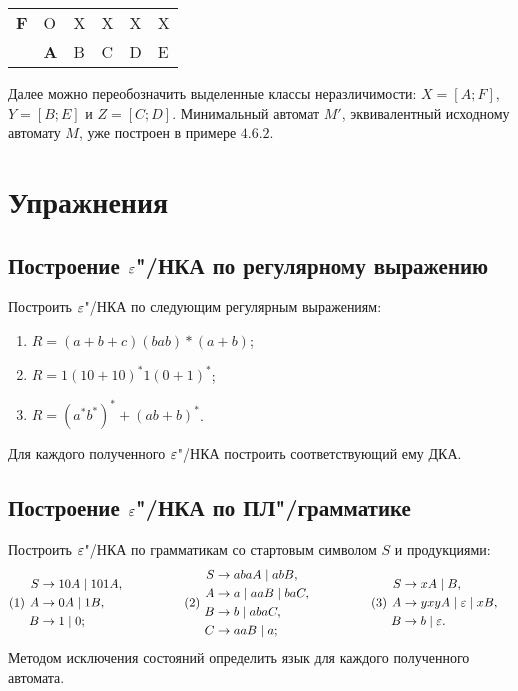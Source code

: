\begin{myexample}
\begin{center}
\begin{tabular}{llllll}
\multicolumn{1}{l|}{\textbf{F}} & \multicolumn{1}{l|}{O} & \multicolumn{1}{l|}{X} & \multicolumn{1}{l|}{X} & \multicolumn{1}{l|}{X} & \multicolumn{1}{l|}{X} \\ \cline{2-6}
                                & \textbf{A}             & B                      & C                      & D                      & E
\end{tabular}
\end{center}
Далее можно переобозначить выделенные классы неразличимости: $X = [A;F]$, $Y = [B;E]$ и $Z = [C;D]$. Минимальный автомат $M'$, эквивалентный исходному автомату $M$, уже построен в примере $4.6.2$.
\end{myexample}


\section{Упражнения}
\label{Chapter4Exs}

\subsection*{Построение $\varepsilon$"/НКА по регулярному выражению}

Построить $\varepsilon$"/НКА по следующим регулярным выражениям:
\begin{enumerate}
	\item $R = (a+b+c)(bab)*(a+b)$;
  \item $R = 1(10+10)^*1(0+1)^*$;
  \item $R = (a^*b^*)^*+(ab+b)^*$.
\end{enumerate}
Для каждого полученного $\varepsilon$"/НКА построить соответствующий ему ДКА. 
\subsection*{Построение $\varepsilon$"/НКА по ПЛ"/грамматике}
Построить $\varepsilon$"/НКА по грамматикам со стартовым символом $S$ и продукциями:
\begin{align*}
    \text{(1) }&
        \begin{aligned}%
            S &\to 10A \mid 101A,\\
            A &\to 0A \mid 1B,\\
            B &\to 1 \mid 0;
        \end{aligned}
        \qquad\qquad
    &
    \text{(2) }&
        \begin{aligned}%
            S &\to abaA \mid abB,\\
            A &\to a \mid aaB \mid baC,\\
            B &\to b \mid abaC,\\
            C &\to aaB \mid a;
		        \end{aligned}
        \qquad\qquad
    &
    \text{(3) }&
        \begin{aligned}%
            S &\to xA \mid B,\\
            A &\to yxyA \mid \eps \mid xB,\\
            B &\to b \mid \eps.
        \end{aligned}
\end{align*}
Методом исключения состояний определить язык для каждого полученного автомата.
